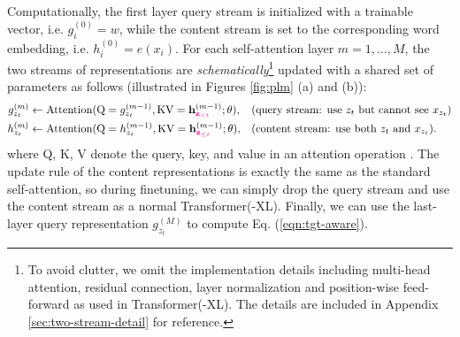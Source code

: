 Computationally, the first layer query stream is initialized with a trainable vector, i.e. $g_i^{(0)} = w$, while the content stream is set to the corresponding word embedding, i.e. $h_i^{(0)} = e(x_i)$.
For each self-attention layer $m = 1, \dots, M$, the two streams of representations are \textit{schematically}\footnote{To avoid clutter, we omit the implementation details including multi-head attention, residual connection, layer normalization and position-wise feed-forward as used in Transformer(-XL). The details are included in Appendix \ref{sec:two-stream-detail} for reference.} updated with a shared set of parameters as follows (illustrated in Figures \ref{fig:plm} (a) and (b)):
\begin{align*}
\small
	g_{z_t}^{(m)} &\leftarrow \text{Attention}(
		\text{Q} = g_{z_t}^{(m-1)}, \text{KV}= \rvh_{\magenta{\rvz_{<t}}}^{(m-1)}; \theta),
	&& (\text{query stream: use $z_t$ but cannot see $x_{z_t}$}) \\
	h_{z_t}^{(m)} &\leftarrow \text{Attention}(
		\text{Q} = h_{z_t}^{(m-1)}, \text{KV}= \rvh_{\magenta{\rvz_{\leq t}}}^{(m-1)}; \theta), 
	&& (\text{content stream: use both $z_t$ and $x_{z_t}$}).
\end{align*}
where Q, K, V denote the query, key, and value in an attention operation \cite{vaswani2017attention}.
The update rule of the content representations is exactly the same as the standard self-attention, so during finetuning, we can simply drop the query stream and use the content stream as a normal Transformer(-XL).
Finally, we can use the last-layer query representation $g_{z_t}^{(M)}$ to compute Eq. (\ref{eqn:tgt-aware}).
